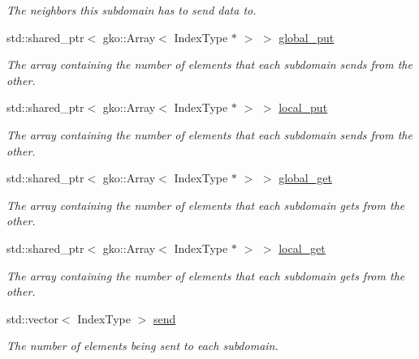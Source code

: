 \begin{DoxyCompactItemize}
\begin{DoxyCompactList}\small\item\em The neighbors this subdomain has to send data to. \end{DoxyCompactList}\item 
std\+::shared\+\_\+ptr$<$ gko\+::\+Array$<$ Index\+Type $\ast$ $>$ $>$ \hyperlink{structschwz_1_1Communicate_1_1comm__struct_a9186bd26e5826aa6ad88c863798593ac}{global\+\_\+put}
\begin{DoxyCompactList}\small\item\em The array containing the number of elements that each subdomain sends from the other. \end{DoxyCompactList}\item 
std\+::shared\+\_\+ptr$<$ gko\+::\+Array$<$ Index\+Type $\ast$ $>$ $>$ \hyperlink{structschwz_1_1Communicate_1_1comm__struct_ace7588b81dd2aa7a84e118df8137252b}{local\+\_\+put}
\begin{DoxyCompactList}\small\item\em The array containing the number of elements that each subdomain sends from the other. \end{DoxyCompactList}\item 
std\+::shared\+\_\+ptr$<$ gko\+::\+Array$<$ Index\+Type $\ast$ $>$ $>$ \hyperlink{structschwz_1_1Communicate_1_1comm__struct_a4166e2bb75eeaf48ee39ca7cdc3adb01}{global\+\_\+get}
\begin{DoxyCompactList}\small\item\em The array containing the number of elements that each subdomain gets from the other. \end{DoxyCompactList}\item 
std\+::shared\+\_\+ptr$<$ gko\+::\+Array$<$ Index\+Type $\ast$ $>$ $>$ \hyperlink{structschwz_1_1Communicate_1_1comm__struct_ab4e91a457646f43106da98a58c332754}{local\+\_\+get}
\begin{DoxyCompactList}\small\item\em The array containing the number of elements that each subdomain gets from the other. \end{DoxyCompactList}\item 
\mbox{\label{structschwz_1_1Communicate_1_1comm__struct_ac5af75e92c875f3546b739be84d2c927}} 
std\+::vector$<$ Index\+Type $>$ \hyperlink{structschwz_1_1Communicate_1_1comm__struct_ac5af75e92c875f3546b739be84d2c927}{send}
\begin{DoxyCompactList}\small\item\em The number of elements being sent to each subdomain. \end{DoxyCompactList}\item 

\end{DoxyCompactItemize}
